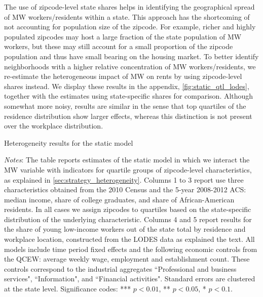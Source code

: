 The use of zipcode-level state shares helps in identifying the geographical spread of MW 
workers/residents within a state. This approach has the shortcoming of not accounting for 
population size of the zipcode. For example, richer and highly populated zipcodes may host a large 
fraction of the state population of MW workers, but these may still account for a small proportion 
of the zipcode population and thus have small bearing on the housing market. To better identify 
neighborhoods with a higher relative concentration of MW workers/residents, we re-estimate the 
heterogeneous impact of MW on rents by using zipcode-level shares instead. We display these results 
in the appendix, \autoref{fig:static_qtl_lodes}, together with the estimates using state-specific 
shares for comparison. Although somewhat more noisy, results are similar in the sense that top 
quartiles of the residence distribution show larger effects, whereas this distinction is not 
present over the workplace distribution.

\begin{table}[h!]
    \caption{Heterogeneity results for the static model}
    \label{tab:fd_model_het}
    \centering
    \resizebox{0.95\textwidth}{!}{             
	    \vspace{0pt}    
	    
    }
    \begin{minipage}{0.95\textwidth} \footnotesize
		\vspace{3mm}
		\textit{Notes}: The table reports estimates of the static model in which we interact the 
		MW variable with indicators for quartile groups of zipcode-level characteristics, as explained
		in \autoref{sec:strategy_heterogeneity}. Columns 1 to 3 report use three characteristics 
		obtained from the 2010 Census and the 5-year 2008-2012 ACS: median income, share of college
		graduates, and share of African-American residents. In all cases we assign zipcodes to quartiles 
		based on the state-specific distribution of the underlying characteristic. Columns 4 and 5 
		report results for the share of young low-income workers out of the state total by residence
		and workplace location, constructed from the LODES data as explained the text. All models
		include time period fixed effects and the following economic controls from the QCEW: average
		weekly wage, employment and establishment count. These controls correspond to the industrial 
		aggregates ``Professional and business services", ``Information", and ``Financial activities".
		Standard errors are clustered at the state level. Significance codes: *** $p < 0.01$, ** 
		$p < 0.05$, * $p < 0.1$.
	\end{minipage}
\end{table}
